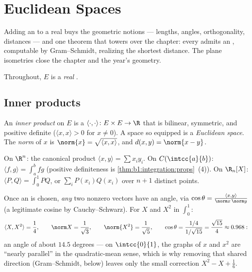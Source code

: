 \chapter{Euclidean Spaces}\label{ch:b1:euclid}

Adding an  to a real  buys the geometric
notions --- lengths, angles, orthogonality, distances --- and one
theorem that towers over the chapter: every  admits an
, computable by Gram--Schmidt, realizing the
shortest distance. The plane isometries close the chapter and the
year's geometry.

Throughout, $E$ is a \emph{real} .

\section{Inner products}

\begin{definition}\label{def:b1:euclid:def}
An \emph{inner product} on $E$ is a 
$\langle\cdot,\cdot\rangle \colon E \times E \to \R$ that is
bilinear, symmetric, and positive definite ($\langle x, x\rangle >
0$ for $x \neq 0$). A  space so equipped is a
\emph{Euclidean space}. The \emph{norm} of
$x$ is $\norm{x} = \sqrt{\langle x, x\rangle}$, and $d(x, y) =
\norm{x - y}$.
\end{definition}

\begin{example}\label{ex:b1:euclid:examples}
On $\R^n$: the canonical product $\langle x, y\rangle = \sum x_i
y_i$. On $C(\intcc{a}{b})$: $\langle f, g \rangle = \int_a^b fg$
(positive definiteness is \cref{thm:b1:integration:props}~(4)). On
$\R_n[X]$: $\langle P, Q\rangle = \int_0^1 PQ$, or $\sum_{i}
P(x_i)Q(x_i)$ over $n+1$ distinct points.
\end{example}

\begin{example}
\label{ex:b1:euclid:polyangle}
Once an  is chosen, \emph{any} two nonzero vectors
have an angle, via $\cos\theta = \frac{\langle x,
y\rangle}{\norm x\,\norm y}$ (a legitimate cosine by
Cauchy--Schwarz). For $X$ and $X^2$ in $\int_0^1$:
\[
\langle X, X^2\rangle = \frac14, \qquad
\norm X = \frac1{\sqrt3}, \qquad \norm{X^2} = \frac1{\sqrt5},
\qquad
\cos\theta = \frac{1/4}{1/\sqrt{15}} = \frac{\sqrt{15}}{4}
\approx 0.968 :
\]
an angle of about $14.5$ degrees --- on $\intcc{0}{1}$, the
graphs of $x$ and $x^2$ are ``nearly parallel'' in the
quadratic-mean sense, which is why removing that shared
direction (Gram--Schmidt, below) leaves only the small
correction $X^2 - X + \frac16$.
\end{example}

